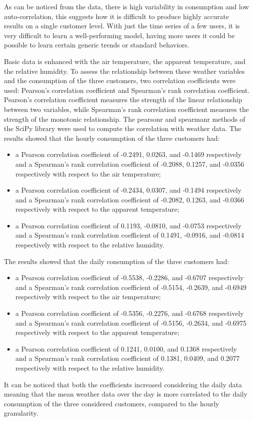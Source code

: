 As can be noticed from the data, there is high variability in consumption and low auto-correlation, this suggests how it is difficult to produce highly accurate results on a single customer level.
With just the time series of a few users, it is very difficult to learn a well-performing model, having more users it could be possible to learn certain generic trends or standard behaviors.

Basic data is enhanced with the air temperature, the apparent temperature, and the relative humidity.
To assess the relationship between these weather variables and the consumption of the three customers, two correlation coefficients were used: Pearson's correlation coefficient and Spearman's rank correlation coefficient.
Pearson's correlation coefficient measures the strength of the linear relationship between two variables, while Spearman's rank correlation coefficient measures the strength of the monotonic relationship.
The pearsonr and spearmanr methods of the SciPy library were used to compute the correlation with weather data.
The results showed that the hourly consumption of the three customers had:
\begin{itemize}
  \item a Pearson correlation coefficient of -0.2491, 0.0263, and -0.1469 respectively and a Spearman's rank correlation coefficient of -0.2088, 0.1257, and -0.0356 respectively with respect to the air temperature;
  \item a Pearson correlation coefficient of -0.2434, 0.0307, and -0.1494 respectively and a Spearman's rank correlation coefficient of -0.2082, 0.1263, and -0.0366 respectively with respect to the apparent temperature;
  \item a Pearson correlation coefficient of 0.1193, -0.0810, and -0.0753 respectively and a Spearman's rank correlation coefficient of 0.1491, -0.0916, and -0.0814 respectively with respect to the relative humidity.
\end{itemize}

The results showed that the daily consumption of the three customers had:
\begin{itemize}
  \item a Pearson correlation coefficient of -0.5538, -0.2286, and -0.6707 respectively and a Spearman's rank correlation coefficient of -0.5154, -0.2639, and -0.6949 respectively with respect to the air temperature;
  \item a Pearson correlation coefficient of -0.5356, -0.2276, and -0.6768 respectively and a Spearman's rank correlation coefficient of -0.5156, -0.2634, and -0.6975 respectively with respect to the apparent temperature;
  \item a Pearson correlation coefficient of 0.1241, 0.0100, and 0.1368 respectively and a Spearman's rank correlation coefficient of 0.1381, 0.0409, and 0.2077 respectively with respect to the relative humidity.
\end{itemize}
It can be noticed that both the coefficients increased considering the daily data meaning that the mean weather data over the day is more correlated to the daily consumption of the three considered customers, compared to the hourly granularity.

